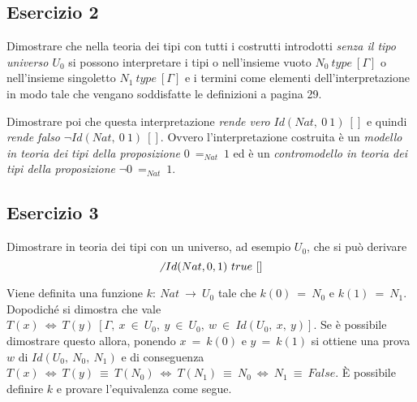 \subsection{Esercizio 2}
\begin{thm}
	Dimostrare che nella teoria dei tipi con tutti i costrutti introdotti \textit{senza il tipo universo $U_0$} si possono interpretare i tipi o nell'insieme vuoto $N_0~type~[\Gamma]$ o nell'insieme singoletto $N_1~type~[\Gamma]$ e i termini come elementi dell'interpretazione in modo tale che vengano soddisfatte le definizioni a pagina 29.
	
	Dimostrare poi che questa interpretazione \textit{rende vero} $Id(Nat,~0~1)~[]$ e quindi \textit{rende falso} $\neg Id(Nat,~0~1)~[]$. Ovvero l'interpretazione costruita è un \textit{modello in teoria dei tipi della proposizione} $0~=_{Nat}~1$ ed è un \textit{contromodello in teoria dei tipi della proposizione} $\neg 0~=_{Nat}~1$.
\end{thm}


\subsection{Esercizio 3}
\begin{thm}
	Dimostrare in teoria dei tipi con un universo, ad esempio $U_0$, che si può derivare
	\[\not~Id(Nat, 0, 1)~true~[]\]
\end{thm}
Viene definita una funzione $k:~Nat~\to~U_0$ tale che $k(0)~=~N_0$ e $k(1)~=~N_1$. Dopodiché si dimostra che vale $T(x)~\iff~T(y)~[\Gamma,~x~\in~U_0,~y~\in~U_0,~w~\in~Id(U_0,~x,~y)]$. Se è possibile dimostrare questo allora, ponendo $x~=~k(0)$ e $y~=~k(1)$ si ottiene una prova $w$ di $Id(U_0,~N_0,~N_1)$ e di conseguenza $T(x)~\iff~T(y)~\equiv~T(N_0)~\iff~T(N_1)~\equiv~N_0~\iff~N_1~\equiv~False$. È possibile definire $k$ e provare l'equivalenza come segue.
